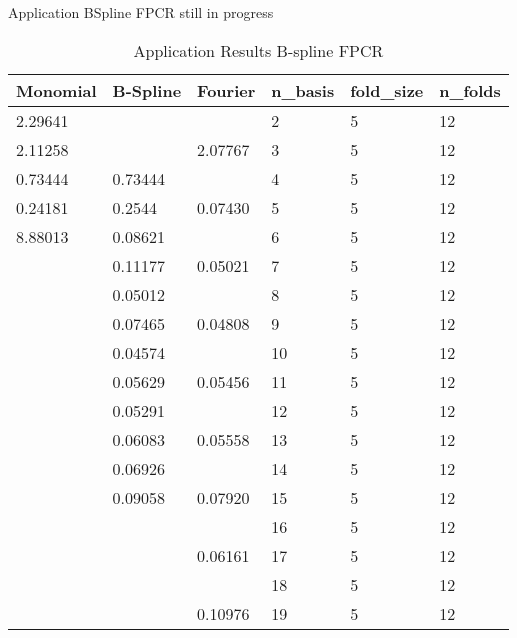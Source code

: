{\color{red} Application BSpline FPCR still in progress}
\begin{table}[htb]
			\centering
			\caption{Application Results B-spline FPCR}
				\begin{tabular}{|lll|lll|}
\hline
Monomial & B-Spline & Fourier                      & \textbf{n\_basis} & \textbf{fold\_size} & \textbf{n\_folds} \\ \hline
2.29641  &          & \multicolumn{1}{l|}{}        & 2       & 5         & 12      \\
2.11258  &          & \multicolumn{1}{l|}{2.07767} & 3       & 5         & 12      \\
0.73444  & 0.73444  & \multicolumn{1}{l|}{}        & 4       & 5         & 12      \\
{\color[HTML]{FE0000} 0.24181}  & 0.2544   & \multicolumn{1}{l|}{0.07430} & 5       & 5         & 12      \\
8.88013  & 0.08621  & \multicolumn{1}{l|}{}        & 6       & 5         & 12      \\
         & 0.11177  & \multicolumn{1}{l|}{0.05021} & 7       & 5         & 12      \\
         & 0.05012  & \multicolumn{1}{l|}{}        & 8       & 5         & 12      \\
         & 0.07465  & \multicolumn{1}{l|}{{\color[HTML]{FE0000} 0.04808}} & 9       & 5         & 12      \\
         & {\color[HTML]{FE0000} 0.04574}  & \multicolumn{1}{l|}{}        & 10      & 5         & 12      \\
         & 0.05629  & \multicolumn{1}{l|}{0.05456} & 11      & 5         & 12      \\
         & 0.05291  & \multicolumn{1}{l|}{}        & 12      & 5         & 12      \\
         & 0.06083  & \multicolumn{1}{l|}{0.05558} & 13      & 5         & 12      \\
         & 0.06926  & \multicolumn{1}{l|}{}        & 14      & 5         & 12      \\
         & 0.09058  & \multicolumn{1}{l|}{0.07920} & 15      & 5         & 12      \\
         &          & \multicolumn{1}{l|}{}        & 16      & 5         & 12      \\
         &          & \multicolumn{1}{l|}{0.06161} & 17      & 5         & 12      \\
         &          & \multicolumn{1}{l|}{}        & 18      & 5         & 12      \\
         &          & \multicolumn{1}{l|}{0.10976} & 19      & 5         & 12      \\ \hline
\end{tabular}
\end{table}

